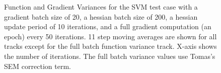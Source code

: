 \documentclass{article}
\begin{document}
\begin{figure}[h]
\centering
{}
\caption{Function and Gradient Variances for the SVM test case with a gradient batch size of 20, a hessian batch size of 200, a hessian update period of 10 iterations, and a full gradient computation (an epoch) every 50 iterations. 11 step moving averages are shown for all tracks except for the full batch function variance track. X-axis shows the number of iterations. The full batch variance values use Tomas's SEM correction term.}
\label{fig:var_20}
\end{figure}
\end{document}
